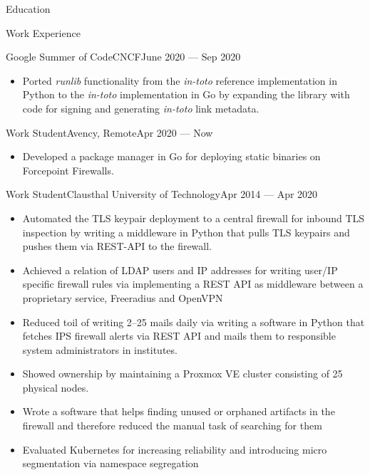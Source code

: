 \documentclass[]{mcdowellcv}
\begin{document}
\begin{cvsection}{Education}
\begin{cvsection}{Work Experience}
\begin{cvsubsection}{Google Summer of Code}{CNCF}{June 2020 --- Sep 2020}
\begin{itemize}
\item Ported \textit{runlib} functionality from the \textit{in-toto} reference implementation in Python to the \textit{in-toto} implementation in Go by expanding the library with code for signing and generating \textit{in-toto} link metadata.
\end{itemize}
\end{cvsubsection}
\begin{cvsubsection}{Work Student}{Avency, Remote}{Apr 2020 --- Now}
\begin{itemize}
\item Developed a package manager in Go for deploying static binaries on Forcepoint Firewalls.
\end{itemize}
\end{cvsubsection}
\begin{cvsubsection}{Work Student}{Clausthal University of Technology}{Apr 2014 --- Apr 2020}
\bigskip
\begin{itemize}
\item Automated the TLS keypair deployment to a central firewall for inbound TLS inspection by writing a middleware in Python that pulls TLS keypairs and pushes them via REST-API to the firewall.
\item Achieved a relation of LDAP users and IP addresses for writing user/IP specific firewall rules via implementing
a REST API as middleware between a proprietary service, Freeradius and OpenVPN
\item Reduced toil of writing 2--25 mails daily via writing a software in Python that fetches IPS firewall alerts via REST API and mails them
to responsible system administrators in institutes.
\item Showed ownership by maintaining a Proxmox VE cluster consisting of 25 physical nodes.
\item Wrote a software that helps finding unused or orphaned artifacts in the firewall and therefore reduced the manual task of searching for them
\item Evaluated Kubernetes for increasing reliability and introducing micro segmentation via namespace segregation
\end{itemize}
\end{cvsubsection}
\end{cvsection}


\end{cvsection}
\end{document}
